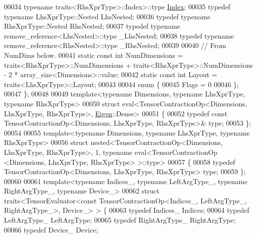 \begin{DoxyCode}
00034                                       \textcolor{keyword}{typename} traits<RhsXprType>::Index>::type 
      \hyperlink{namespace_eigen_a62e77e0933482dafde8fe197d9a2cfde}{Index};
00035   \textcolor{keyword}{typedef} \textcolor{keyword}{typename} LhsXprType::Nested LhsNested;
00036   \textcolor{keyword}{typedef} \textcolor{keyword}{typename} RhsXprType::Nested RhsNested;
00037   \textcolor{keyword}{typedef} \textcolor{keyword}{typename} remove\_reference<LhsNested>::type \_LhsNested;
00038   \textcolor{keyword}{typedef} \textcolor{keyword}{typename} remove\_reference<RhsNested>::type \_RhsNested;
00039 
00040   \textcolor{comment}{// From NumDims below.}
00041   \textcolor{keyword}{static} \textcolor{keyword}{const} \textcolor{keywordtype}{int} NumDimensions = traits<RhsXprType>::NumDimensions + traits<RhsXprType>::NumDimensions - 
      2 * array\_size<Dimensions>::value;
00042   \textcolor{keyword}{static} \textcolor{keyword}{const} \textcolor{keywordtype}{int} Layout = traits<LhsXprType>::Layout;
00043 
00044   \textcolor{keyword}{enum} \{
00045     Flags = 0
00046   \};
00047 \};
00048 
00049 \textcolor{keyword}{template}<\textcolor{keyword}{typename} Dimensions, \textcolor{keyword}{typename} LhsXprType, \textcolor{keyword}{typename} RhsXprType>
00050 \textcolor{keyword}{struct }eval<TensorContractionOp<Dimensions, LhsXprType, RhsXprType>, \hyperlink{namespace_eigen}{Eigen}::Dense>
00051 \{
00052   \textcolor{keyword}{typedef} \textcolor{keyword}{const} TensorContractionOp<Dimensions, LhsXprType, RhsXprType>& type;
00053 \};
00054 
00055 \textcolor{keyword}{template}<\textcolor{keyword}{typename} Dimensions, \textcolor{keyword}{typename} LhsXprType, \textcolor{keyword}{typename} RhsXprType>
00056 \textcolor{keyword}{struct }nested<TensorContractionOp<Dimensions, LhsXprType, RhsXprType>, 1, typename eval<TensorContractionOp
      <Dimensions, LhsXprType, RhsXprType> >::type>
00057 \{
00058   \textcolor{keyword}{typedef} TensorContractionOp<Dimensions, LhsXprType, RhsXprType> type;
00059 \};
00060 
00061 \textcolor{keyword}{template}<\textcolor{keyword}{typename} Indices\_, \textcolor{keyword}{typename} LeftArgType\_, \textcolor{keyword}{typename} RightArgType\_, \textcolor{keyword}{typename} Device\_>
00062 \textcolor{keyword}{struct }traits<TensorEvaluator<const TensorContractionOp<Indices\_, LeftArgType\_, RightArgType\_>, Device\_> >
       \{
00063   \textcolor{keyword}{typedef} Indices\_ Indices;
00064   \textcolor{keyword}{typedef} LeftArgType\_ LeftArgType;
00065   \textcolor{keyword}{typedef} RightArgType\_ RightArgType;
00066   \textcolor{keyword}{typedef} Device\_ Device;

\end{DoxyCode}
